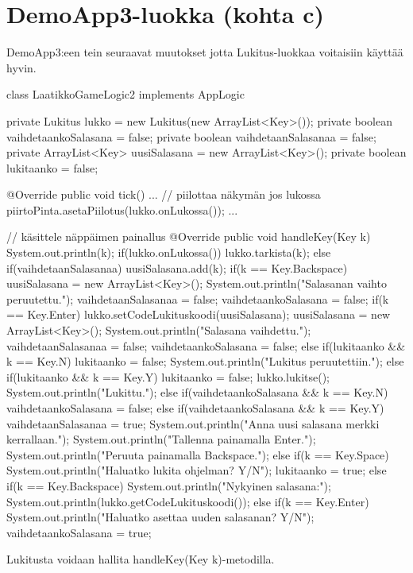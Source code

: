 \section{DemoApp3-luokka (kohta c)}

\label{DemoApp3-luokka}

DemoApp3:een tein seuraavat muutokset jotta Lukitus-luokkaa voitaisiin käyttää hyvin.

\begin{javacode}
class LaatikkoGameLogic2 implements AppLogic {
  private Lukitus lukko = new Lukitus(new ArrayList<Key>());
  private boolean vaihdetaankoSalasana = false;
  private boolean vaihdetaanSalasanaa = false;
  private ArrayList<Key> uusiSalasana = new ArrayList<Key>();
  private boolean lukitaanko = false;

  @Override
  public void tick() {
    ...
    // piilottaa näkymän jos lukossa
    piirtoPinta.asetaPiilotus(lukko.onLukossa());
    ...
  }

  // käsittele näppäimen painallus
  @Override
  public void handleKey(Key k) {
    System.out.println(k);
    if(lukko.onLukossa()) {
      lukko.tarkista(k);
    }
    else if(vaihdetaanSalasanaa) {
         uusiSalasana.add(k);
         if(k == Key.Backspace) {
           uusiSalasana = new ArrayList<Key>();
           System.out.println("Salasanan vaihto peruutettu.");
           vaihdetaanSalasanaa = false;
           vaihdetaankoSalasana = false;
         }
         if(k == Key.Enter) {
           lukko.setCodeLukituskoodi(uusiSalasana);
           uusiSalasana = new ArrayList<Key>();
           System.out.println("Salasana vaihdettu.");
           vaihdetaanSalasanaa = false;
           vaihdetaankoSalasana = false;
         }
       }
       else if(lukitaanko && k == Key.N) {
         lukitaanko = false;
         System.out.println("Lukitus peruutettiin.");
        }
       else if(lukitaanko && k == Key.Y) {
         lukitaanko = false;
         lukko.lukitse();
         System.out.println("Lukittu.");
       }
       else if(vaihdetaankoSalasana && k == Key.N) {
         vaihdetaankoSalasana = false;
       }
       else if(vaihdetaankoSalasana && k == Key.Y) {
         vaihdetaanSalasanaa = true;
         System.out.println("Anna uusi salasana merkki kerrallaan.");
         System.out.println("Tallenna painamalla Enter.");
         System.out.println("Peruuta painamalla Backspace.");
       }
       else if(k == Key.Space) {
         System.out.println("Haluatko lukita ohjelman? Y/N");
         lukitaanko = true;
       }
       else if(k == Key.Backspace) {
         System.out.println("Nykyinen salasana:");
         System.out.println(lukko.getCodeLukituskoodi());
       }
       else if(k == Key.Enter) {
         System.out.println("Haluatko asettaa uuden salasanan? Y/N");
         vaihdetaankoSalasana = true;
       }
    }
}
\end{javacode}

Lukitusta voidaan hallita handleKey(Key k)-metodilla.